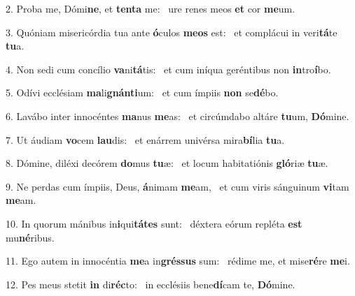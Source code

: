 2. Proba me, Dómi\textbf{ne}, et \textbf{ten}\textbf{ta} me: \ast\  ure renes meos \textbf{et} cor \textbf{me}um.\

3. Quóniam misericórdia tua ante \textbf{ó}culos \textbf{me}\textbf{os} est: \ast\  et complácui in veri\textbf{tá}te \textbf{tu}a.\

4. Non sedi cum concílio \textbf{va}ni\textbf{tá}tis: \ast\  et cum iníqua geréntibus non \textbf{in}tro\textbf{í}bo.\

5. Odívi ecclésiam \textbf{ma}li\textbf{gnán}\textbf{ti}um: \ast\  et cum ímpiis \textbf{non} se\textbf{dé}bo.\

6. Lavábo inter innocéntes \textbf{ma}nus \textbf{me}as: \ast\  et circúmdabo altáre \textbf{tu}um, \textbf{Dó}mine.\

7. Ut áudiam \textbf{vo}cem \textbf{lau}dis: \ast\  et enárrem univérsa mira\textbf{bí}lia \textbf{tu}a.\

8. Dómine, diléxi decórem \textbf{do}mus \textbf{tu}æ: \ast\  et locum habitatiónis \textbf{gló}riæ \textbf{tu}æ.\

9. Ne perdas cum ímpiis, Deus, \textbf{á}nimam \textbf{me}am, \ast\  et cum viris sánguinum \textbf{vi}tam \textbf{me}am.\

10. In quorum mánibus in\textbf{i}qui\textbf{tá}\textbf{tes} sunt: \ast\  déxtera eórum repléta \textbf{est} mu\textbf{né}ribus.\

11. Ego autem in innocéntia \textbf{me}a in\textbf{grés}\textbf{sus} sum: \ast\  rédime me, et mise\textbf{ré}re \textbf{me}i.\

12. Pes meus stetit \textbf{in} di\textbf{réc}to: \ast\  in ecclésiis bene\textbf{dí}cam te, \textbf{Dó}mine.\

